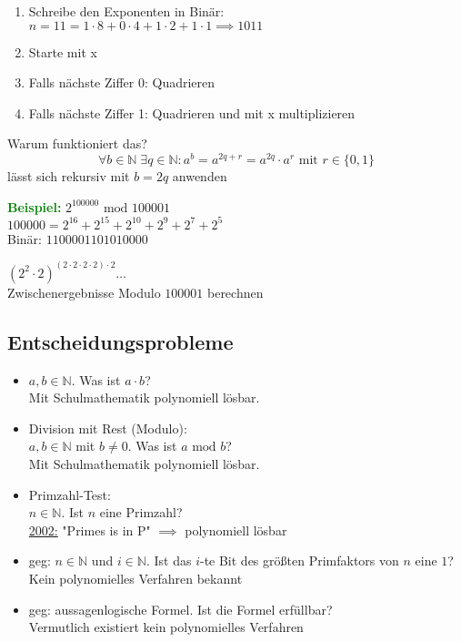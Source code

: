 \documentclass{article}
\newcommand{\green}[1]{\textcolor{green}{#1}}
\newcommand{\ex}{\green{\textbf{Beispiel: }}}
\newcommand{\N}{\mathbb{N}}
\renewcommand{\mod}{\text{ mod }}
\begin{document}
\begin{enumerate}
    \item Schreibe den Exponenten in Binär:\\
    $n = 11 = 1 \cdot 8 + 0 \cdot 4 + 1 \cdot 2 + 1 \cdot 1 \implies 1011$
    \item Starte mit x
    \item Falls nächste Ziffer 0: Quadrieren
    \item Falls nächste Ziffer 1: Quadrieren und mit x multiplizieren
\end{enumerate}

Warum funktioniert das?
\[
    \forall b \in \N \; \exists q \in \N: a^b = a^{2q+r} = a^{2q} \cdot a^r \text{ mit } r \in \{0,1\}
\]
lässt sich rekursiv mit $b = 2q$ anwenden

\ex $2^{100000} \mod 100001$\\
$100000 = 2^{16} + 2^{15} + 2^{10} + 2^9 + 2^7 + 2^5$\\
Binär: $1100001101010000$

$\left( 2^2 \cdot 2\right)^{(2 \cdot 2 \cdot 2 \cdot 2) \cdot 2} \dots$\\
Zwischenergebnisse Modulo $100001$ berechnen

\subsection{Entscheidungsprobleme}

\begin{itemize}
    \item $a,b \in \N$. Was ist $a \cdot b$?\\
    Mit Schulmathematik polynomiell lösbar.
    \item Division mit Rest (Modulo):\\
    $a,b \in \N$ mit $b \neq 0$. Was ist $a \mod b$?\\
    Mit Schulmathematik polynomiell lösbar.
    \item Primzahl-Test:\\
    $n \in \N$. Ist $n$ eine Primzahl?\\
    \underline{2002:} "Primes is in P" $\implies$ polynomiell lösbar
    \item geg: $n \in \N$ und $i \in \N$. Ist das $i$-te Bit des größten Primfaktors von $n$ eine $1$?\\
    Kein polynomielles Verfahren bekannt
    \item geg: aussagenlogische Formel. Ist die Formel erfüllbar?\\
    Vermutlich existiert kein polynomielles Verfahren
\end{itemize}
\end{document}
